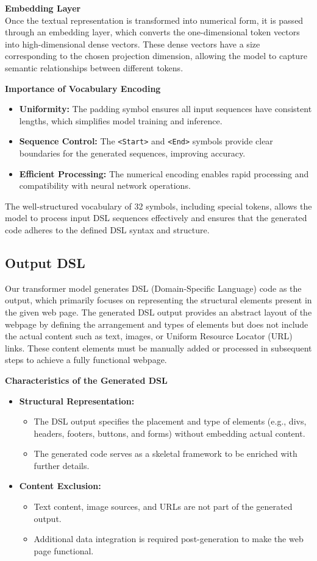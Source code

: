 \textbf{Embedding Layer}\\
Once the textual representation is transformed into numerical form, it is passed through an embedding layer, which converts the one-dimensional token vectors into high-dimensional dense vectors. These dense vectors have a size corresponding to the chosen projection dimension, allowing the model to capture semantic relationships between different tokens.

\textbf{Importance of Vocabulary Encoding}
\begin{itemize}
    \item \textbf{Uniformity:} The padding symbol ensures all input sequences have consistent lengths, which simplifies model training and inference.
    \item \textbf{Sequence Control:} The \texttt{<Start>} and \texttt{<End>} symbols provide clear boundaries for the generated sequences, improving accuracy.
    \item \textbf{Efficient Processing:} The numerical encoding enables rapid processing and compatibility with neural network operations.
\end{itemize}
The well-structured vocabulary of 32 symbols, including special tokens, allows the model to process input DSL sequences effectively and ensures that the generated code adheres to the defined DSL syntax and structure.


\subsection{Output DSL}
Our transformer model generates DSL (Domain-Specific Language) code as the output, which primarily focuses on representing the structural elements present in the given web page. The generated DSL output provides an abstract layout of the webpage by defining the arrangement and types of elements but does not include the actual content such as text, images, or Uniform Resource Locator (URL) links. These content elements must be manually added or processed in subsequent steps to achieve a fully functional webpage.

\textbf{Characteristics of the Generated DSL}
\begin{itemize}
    \item \textbf{Structural Representation:} 
        \begin{itemize}
            \item The DSL output specifies the placement and type of elements (e.g., divs, headers, footers, buttons, and forms) without embedding actual content.
            \item The generated code serves as a skeletal framework to be enriched with further details.
        \end{itemize}
    \item \textbf{Content Exclusion:}
        \begin{itemize}
            \item Text content, image sources, and URLs are not part of the generated output.
            \item Additional data integration is required post-generation to make the web page functional. 
        \end{itemize}
\end{itemize}
